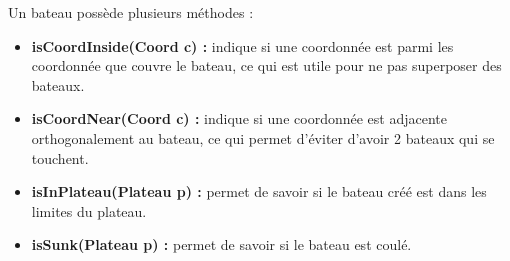 Un bateau possède plusieurs méthodes :\\

\begin{itemize}
\item{\textbf{isCoordInside(Coord c) :}} indique si une coordonnée est parmi les coordonnée que couvre le bateau, ce qui est utile pour ne pas superposer des bateaux.
\item{\textbf{isCoordNear(Coord c) :}} indique si une coordonnée est adjacente orthogonalement au bateau, ce qui permet d'éviter d'avoir 2 bateaux qui se touchent.
\item{\textbf{isInPlateau(Plateau p) :}} permet de savoir si le bateau créé est dans les limites du plateau.
\item{\textbf{isSunk(Plateau p) :}} permet de savoir si le bateau est coulé.
\end{itemize}